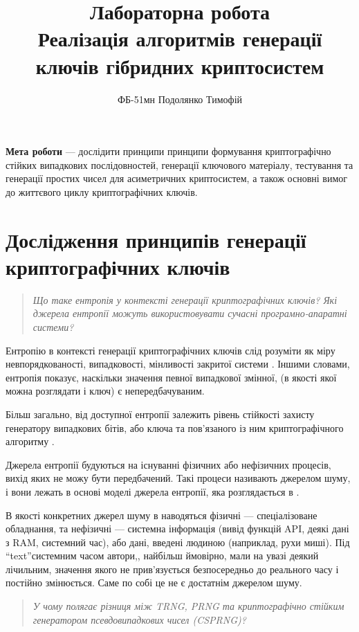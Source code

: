 \documentclass{kpi-lab}
\title{Лабораторна робота \textnumero 2\\
  Реалізація алгоритмів генерації ключів гібридних криптосистем
}
\author{ФБ-51мн Подолянко Тимофій}
\date{}
\begin{document}
\maketitle
\setcounter{tocdepth}{1}
\tableofcontents
\bigskip

\textbf{Мета роботи} ---
дослідити принципи принципи формування криптографічно
стійких випадкових
послідовностей, генерації ключового матеріалу, тестування
та генерації простих чисел
для асиметричних криптосистем, а також основні вимог до
життєвого циклу
криптографічних ключів.

\chapter{Дослідження принципів генерації криптографічних
ключів}\label{chapter:rsa-keygen}

\begin{quote}\small\it
  Що таке ентропія у контексті генерації криптографічних
  ключів? Які джерела ентропії можуть використовувати
  сучасні програмно-апаратні системи?
\end{quote}

Ентропію в контексті генерації криптографічних ключів слід розуміти як
міру невпорядкованості, випадковості, мінливості закритої системи
\cite{Barker2020}.
Іншими словами, ентропія показує, наскільки значення певної
випадкової змінної, (в якості якої можна розглядати і ключ)
є непередбачуваним.

Більш загально, від доступної ентропії залежить рівень
стійкості захисту генератору випадкових бітів, або ключа та
пов'язаного із ним криптографічного алгоритму \cite{Barker2020}.

Джерела ентропії будуються на існуванні
фізичних або нефізичних процесів, вихід яких не можу бути
передбачений.
Такі процеси називають джерелом шуму, і вони лежать в
основі моделі джерела ентропії, яка розглядається в
\cite{Turan2018}.

В якості конкретних джерел шуму в \cite{Turan2018}
наводяться фізичні --- спеціалізоване обладнання,
та нефізичні --- системна інформація (вивід функцій API,
деякі дані з RAM, системний час),
або дані, введені людиною (наприклад, рухи миші).
Під \enquote{text}{системним часом} автори,, найбільш
ймовірно, мали на увазі
деякий лічильним, значення якого не прив'язується
безпосередньо до реального часу
і постійно змінюється.
Саме по собі це не є достатнім джерелом шуму.

\begin{quote}\small\it
  У чому полягає різниця між TRNG, PRNG та криптографічно
  стійким генератором псевдовипадкових чисел (CSPRNG)?
\end{quote}
\end{document}
